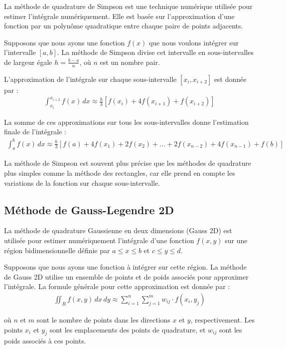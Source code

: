 \documentclass[10pt,a4paper]{article}
\begin{document}
La méthode de quadrature de Simpson est une technique numérique utilisée pour estimer l'intégrale numériquement. Elle est basée sur l'approximation d'une fonction par un polynôme quadratique entre chaque paire de points adjacents.

Supposons que nous ayons une fonction $f(x)$ que nous voulons intégrer sur l'intervalle $[a, b]$. La méthode de Simpson divise cet intervalle en sous-intervalles de largeur égale $h = \frac{b - a}{n}$, où $n$ est un nombre pair.

L'approximation de l'intégrale sur chaque sous-intervalle $[x_i, x_{i+2}]$ est donnée par :
\begin{align*}
\int_{x_i}^{x_{i+2}} f(x) \,dx \approx \frac{h}{3} \left[ f(x_i) + 4f(x_{i+1}) + f(x_{i+2}) \right]
\end{align*}

La somme de ces approximations sur tous les sous-intervalles donne l'estimation finale de l'intégrale :
\begin{align*}
\int_{a}^{b} f(x) \,dx \approx \frac{h}{3} \left[ f(a) + 4f(x_1) + 2f(x_2) + \ldots + 2f(x_{n-2}) + 4f(x_{n-1}) + f(b) \right]
\end{align*}

La méthode de Simpson est souvent plus précise que les méthodes de quadrature plus simples comme la méthode des rectangles, car elle prend en compte les variations de la fonction sur chaque sous-intervalle.


\subsection{Méthode de Gauss-Legendre 2D}


La méthode de quadrature Gaussienne en deux dimensions (Gauss 2D) est utilisée pour estimer numériquement l'intégrale d'une fonction $f(x, y)$ sur une région bidimensionnelle définie par $a \leq x \leq b$ et $c \leq y \leq d$.

Supposons que nous ayons une fonction à intégrer sur cette région. La méthode de Gauss 2D utilise un ensemble de points et de poids associés pour approximer l'intégrale. La formule générale pour cette approximation est donnée par :
\begin{align*}
\iint_{R} f(x, y) \,dx\,dy \approx \sum_{i=1}^{n} \sum_{j=1}^{m} w_{ij} \cdot f(x_i, y_j)
\end{align*}

où $n$ et $m$ sont le nombre de points dans les directions $x$ et $y$, respectivement. Les points $x_i$ et $y_j$ sont les emplacements des points de quadrature, et $w_{ij}$ sont les poids associés à ces points.
\end{document}
